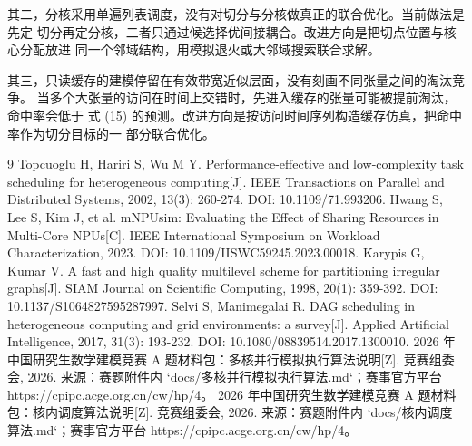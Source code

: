 \documentclass[bwprint]{gmcmthesis}
\begin{document}
其二，分核采用单遍列表调度，没有对切分与分核做真正的联合优化。当前做法是先定
切分再定分核，二者只通过候选择优间接耦合。改进方向是把切点位置与核心分配放进
同一个邻域结构，用模拟退火或大邻域搜索联合求解。

其三，只读缓存的建模停留在有效带宽近似层面，没有刻画不同张量之间的淘汰竞争。
当多个大张量的访问在时间上交错时，先进入缓存的张量可能被提前淘汰，命中率会低于
式 (15) 的预测。改进方向是按访问时间序列构造缓存仿真，把命中率作为切分目标的一
部分联合优化。

\begin{thebibliography}{9}
 Topcuoglu H, Hariri S, Wu M Y. Performance-effective and low-complexity task scheduling for heterogeneous computing[J]. IEEE Transactions on Parallel and Distributed Systems, 2002, 13(3): 260-274. DOI: 10.1109/71.993206.
 Hwang S, Lee S, Kim J, et al. mNPUsim: Evaluating the Effect of Sharing Resources in Multi-Core NPUs[C]. IEEE International Symposium on Workload Characterization, 2023. DOI: 10.1109/IISWC59245.2023.00018.
 Karypis G, Kumar V. A fast and high quality multilevel scheme for partitioning irregular graphs[J]. SIAM Journal on Scientific Computing, 1998, 20(1): 359-392. DOI: 10.1137/S1064827595287997.
 Selvi S, Manimegalai R. DAG scheduling in heterogeneous computing and grid environments: a survey[J]. Applied Artificial Intelligence, 2017, 31(3): 193-232. DOI: 10.1080/08839514.2017.1300010.
 2026 年中国研究生数学建模竞赛 A 题材料包：多核并行模拟执行算法说明[Z]. 竞赛组委会, 2026. 来源：赛题附件内 `docs/多核并行模拟执行算法.md`；赛事官方平台 https://cpipc.acge.org.cn/cw/hp/4。
 2026 年中国研究生数学建模竞赛 A 题材料包：核内调度算法说明[Z]. 竞赛组委会, 2026. 来源：赛题附件内 `docs/核内调度算法.md`；赛事官方平台 https://cpipc.acge.org.cn/cw/hp/4。
\end{thebibliography}
\label{body:end}
\end{document}
